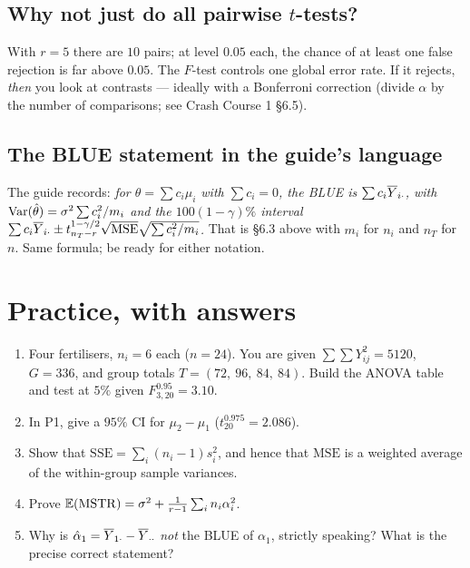 \documentclass[11pt]{article}
\begin{document}
\subsection{Why not just do all pairwise $t$-tests?}
With $r=5$ there are $10$ pairs; at level $0.05$ each, the chance of at least one false
rejection is far above $0.05$. The $F$-test controls one global error rate. If it rejects,
\emph{then} you look at contrasts --- ideally with a Bonferroni correction (divide $\alpha$ by
the number of comparisons; see Crash Course 1 \S6.5).

\subsection{The BLUE statement in the guide's language}
The guide records: \emph{for $\theta=\sum c_i\mu_i$ with $\sum c_i=0$, the BLUE is
$\sum c_i\overline{Y}_{i\cdot}$, with $\operatorname{Var}(\hat\theta)=\sigma^2\sum c_i^2/m_i$ and the
$100(1-\gamma)\%$ interval $\sum c_i\overline{Y}_{i\cdot}\pm t^{1-\gamma/2}_{n_T-r}\sqrt{\mathrm{MSE}}\sqrt{\sum c_i^2/m_i}$.}
That is \S6.3 above with $m_i$ for $n_i$ and $n_T$ for $n$. Same formula; be ready for either
notation.

\section{Practice, with answers}

\begin{enumerate}[label=\textbf{P\arabic*.}]
\item Four fertilisers, $n_i=6$ each ($n=24$). You are given $\sum\sum Y_{ij}^2=5120$,
      $G=336$, and group totals $T=(72,\ 96,\ 84,\ 84)$. Build the ANOVA table and test at
      $5\%$ given $F^{0.95}_{3,20}=3.10$.

\item In P1, give a $95\%$ CI for $\mu_2-\mu_1$ ($t^{0.975}_{20}=2.086$).

\item Show that $\mathrm{SSE}=\sum_i(n_i-1)s_i^2$, and hence that $\mathrm{MSE}$ is a weighted
      average of the within-group sample variances.

\item Prove $\mathbb{E}(\mathrm{MSTR})=\sigma^2+\frac{1}{r-1}\sum_i n_i\alpha_i^2$.

\item Why is $\hat\alpha_1=\overline{Y}_{1\cdot}-\overline{Y}_{\cdot\cdot}$ \emph{not} the BLUE of
      $\alpha_1$, strictly speaking? What is the precise correct statement?
\end{enumerate}
\end{document}
